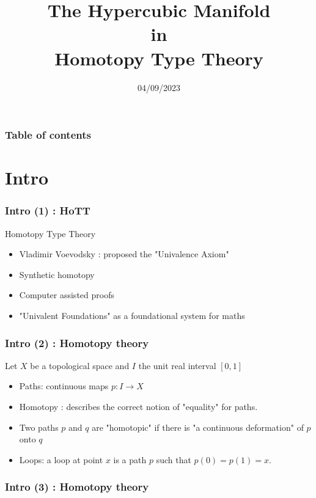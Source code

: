 \documentclass{beamer}
\title{
    The Hypercubic Manifold\\
    in\\
    Homotopy Type Theory}
\date{04/09/2023}
\author{{Dylan Laird} \\ 
{\and} \\
{Supervisors} \\
{Samuel MIMRAM} \\ {Emile OLEON}}
\institute{LIX, Polytechnique}
\begin{document}
\frame{\titlepage}

\begin{frame}
    \frametitle{Table of contents}
    \tableofcontents
\end{frame}
\section{Intro}
\begin{frame}
    \frametitle{Intro (1) : HoTT }
    \begin{exampleblock}{Homotopy Type Theory}
        \begin{itemize}
            \item Vladimir Voevodsky : proposed the "Univalence Axiom"
            \pause
            \item Synthetic homotopy
            \pause
            \item Computer assisted proofs
            \pause
            \item "Univalent Foundations" as a foundational system for maths
        \end{itemize}
    \end{exampleblock}
\end{frame}
\begin{frame}
    \frametitle{Intro (2) : Homotopy theory}
    Let $X$ be a topological space and $I$ the unit real interval $[0,1]$
    \pause
    \begin{itemize}
        \item Paths:  continuous maps $p : I \rightarrow X$
        \pause
        \item Homotopy : describes the correct notion of "equality" for paths. \\
        \pause
        \item Two paths $p$ and $q$ are "homotopic" if there is "a continuous deformation" of $p$ onto $q$
        \pause
        \item Loops: a loop at point $x$ is a path $p$ such that $p(0)=p(1)=x$.
    \end{itemize}
\end{frame}
\begin{frame}
    \frametitle{Intro (3) : Homotopy theory}
    \begin{figure}[h]
        \centering
    \end{figure}
\end{frame}
\end{document}
